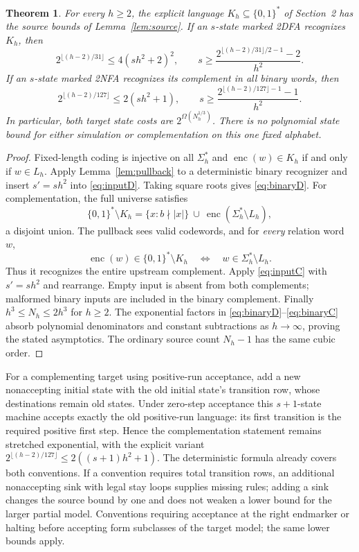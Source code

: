 \documentclass[11pt]{article}
\newtheorem{theorem}{Theorem}
\newcommand{\bits}{\{0,1\}}
\newcommand{\enc}{\operatorname{enc}}
\begin{document}
\begin{theorem}\label{thm:main}
For every $h\ge2$, the explicit language $K_h\subseteq\bits^*$ of Section~2
has the source bounds of Lemma~\ref{lem:source}. If an $s$-state marked
2DFA recognizes $K_h$, then
\begin{equation}\label{eq:binaryD}
 2^{\lfloor(h-2)/31\rfloor}\le4(sh^2+2)^2,
 \qquad
 s\ge\frac{2^{\lfloor(h-2)/31\rfloor/2-1}-2}{h^2}.
\end{equation}
If an $s$-state marked 2NFA recognizes its complement in all binary words,
then
\begin{equation}\label{eq:binaryC}
 2^{\lfloor(h-2)/127\rfloor}\le2(sh^2+1),
 \qquad
 s\ge\frac{2^{\lfloor(h-2)/127\rfloor-1}-1}{h^2}.
\end{equation}
In particular, both target state costs are $2^{\Omega(N_h^{1/3})}$.
There is no polynomial state bound for either simulation or complementation
on this one fixed alphabet.
\end{theorem}
\begin{proof}
Fixed-length coding is injective on all $\Sigma_h^*$ and
$\enc(w)\in K_h$ if and only if $w\in L_h$. Apply Lemma~\ref{lem:pullback}
to a deterministic binary recognizer and insert $s'=sh^2$ into
\eqref{eq:inputD}. Taking square roots gives \eqref{eq:binaryD}.
For complementation, the full universe satisfies
\[
 \bits^*\setminus K_h
 =\{x:b\nmid |x|\}\ \cup\ \enc(\Sigma_h^*\setminus L_h),
\]
a disjoint union. The pullback sees valid codewords, and for \emph{every}
relation word $w$,
\[
 \enc(w)\in\bits^*\setminus K_h\quad\Longleftrightarrow\quad
 w\in\Sigma_h^*\setminus L_h.
\]
Thus it recognizes the entire upstream complement. Apply \eqref{eq:inputC}
with $s'=sh^2$ and rearrange. Empty input is absent from both complements;
malformed binary inputs are included in the binary complement.
Finally $h^3\le N_h\le2h^3$ for $h\ge2$. The exponential factors in
\eqref{eq:binaryD}--\eqref{eq:binaryC} absorb polynomial denominators and
constant subtractions as $h\to\infty$, proving the stated asymptotics.
The ordinary source count $N_h-1$ has the same cubic order.
\end{proof}

For a complementing target using positive-run acceptance, add a new
nonaccepting initial state with the old initial state's transition row,
whose destinations remain old states. Under zero-step acceptance this
$s+1$-state machine accepts exactly the old positive-run language:
its first transition is the required positive first step. Hence the
complementation statement remains stretched exponential, with the explicit
variant $2^{\lfloor(h-2)/127\rfloor}\le2((s+1)h^2+1)$.
The deterministic formula already covers both conventions. If a convention
requires total transition rows, an additional nonaccepting sink with legal
stay loops supplies missing rules; adding a sink changes the source bound
by one and does not weaken a lower bound for the larger partial model.
Conventions requiring acceptance at the right endmarker or halting before
accepting form subclasses of the target model; the same lower bounds apply.
\end{document}
